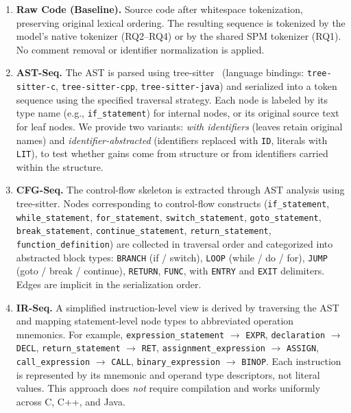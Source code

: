 \documentclass[pdflatex,sn-mathphys,Numbered]{sn-jnl}
\begin{document}
\begin{enumerate}
\item \textbf{Raw Code (Baseline).} Source code after whitespace tokenization, preserving original lexical ordering. The resulting sequence is tokenized by the model's native tokenizer (RQ2--RQ4) or by the shared SPM tokenizer (RQ1). No comment removal or identifier normalization is applied.

\item \textbf{AST-Seq.} The AST is parsed using tree-sitter~\citep{bruns2020treesitter} (language bindings: \texttt{tree-sitter-c}, \texttt{tree-sitter-cpp}, \texttt{tree-sitter-java}) and serialized into a token sequence using the specified traversal strategy. Each node is labeled by its type name (e.g., \texttt{if\_statement}) for internal nodes, or its original source text for leaf nodes. We provide two variants: \emph{with identifiers} (leaves retain original names) and \emph{identifier-abstracted} (identifiers replaced with \texttt{ID}, literals with \texttt{LIT}), to test whether gains come from structure or from identifiers carried within the structure.

\item \textbf{CFG-Seq.} The control-flow skeleton is extracted through AST analysis using tree-sitter. Nodes corresponding to control-flow constructs (\texttt{if\_statement}, \texttt{while\_statement}, \texttt{for\_statement}, \texttt{switch\_statement}, \texttt{goto\_statement}, \texttt{break\_statement}, \texttt{continue\_statement}, \texttt{return\_statement}, \texttt{function\_definition}) are collected in traversal order and categorized into abstracted block types: \texttt{BRANCH} (if / switch), \texttt{LOOP} (while / do / for), \texttt{JUMP} (goto / break / continue), \texttt{RETURN}, \texttt{FUNC}, with \texttt{ENTRY} and \texttt{EXIT} delimiters. Edges are implicit in the serialization order.

\item \textbf{IR-Seq.} A simplified instruction-level view is derived by traversing the AST and mapping statement-level node types to abbreviated operation mnemonics. For example, \texttt{expression\_statement} $\to$ \texttt{EXPR}, \texttt{declaration} $\to$ \texttt{DECL}, \texttt{return\_statement} $\to$ \texttt{RET}, \texttt{assignment\_expression} $\to$ \texttt{ASSIGN}, \texttt{call\_expression} $\to$ \texttt{CALL}, \texttt{binary\_expression} $\to$ \texttt{BINOP}. Each instruction is represented by its mnemonic and operand type descriptors, not literal values. This approach does \emph{not} require compilation and works uniformly across C, C++, and Java.
\end{enumerate}
\end{document}
